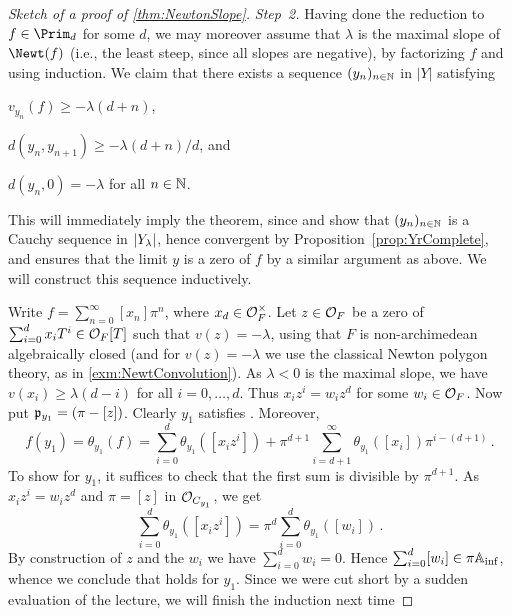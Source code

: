 \documentclass[a4paper, 10pt, oneside, DIV=9, chapterprefix=true, numbers=enddot,bibliography=totoc]{scrbook}
\begin{document}
\begin{proof}[Sketch of a proof of \cref{thm:NewtonSlope}]
	\emph{Step~2.} Having done the reduction to $f\in\Prim_d$ for some $d$, we may moreover assume that $\lambda$ is the maximal slope of $\Newt(f)$ (i.e., the least steep, since all slopes are negative), by factorizing $f$ and using induction. We claim that there exists a sequence $(y_n)_{n\in\mathbb{N}}$ in $|Y|$ satisfying
	\begin{alphanumerate}
		\item $v_{y_n}(f)\geq -\lambda(d+n)$,
		\item $d(y_n,y_{n+1})\geq -\lambda(d+n)/d$, and
		\item $d(y_n,0)=-\lambda$ for all $n\in\mathbb{N}$.
	\end{alphanumerate}
	This will immediately imply the theorem, since  and  show that $(y_n)_{n\in\mathbb{N}}$ is a Cauchy sequence in $|Y_{\-\lambda}|$, hence convergent by Proposition~\cref{prop:YrComplete}, and  ensures that the limit $y$ is a zero of $f$ by a similar argument as above. We will construct this sequence inductively.
	
	Write $f= \sum_{n=0}^\infty[x_n]\pi^n$, where $x_d\in\mathcal{O}_F^\times$. Let $z\in\mathcal{O}_F$ be a zero of $\sum_{i=0}^dx_iT^i\in\mathcal{O}_F[T]$ such that $v(z)=-\lambda$, using that $F$ is non-archimedean algebraically closed (and for $v(z)=-\lambda$ we use the classical Newton polygon theory, as in \cref{exm:NewtConvolution}). As $\lambda <0$ is the maximal slope, we have $v(x_i)\geq \lambda(d-i)$ for all $i=0,\dotsc,d$. Thus $x_iz^i=w_iz^d$ for some $w_i\in\mathcal{O}_F$. Now put $\mathfrak{p}_{y_1}=(\pi-[z])$. Clearly $y_1$ satisfies . Moreover,
	\begin{equation*}
		f(y_1)=\theta_{y_1}(f)=\sum_{i=0}^d\theta_{y_1}([x_iz^i])+\pi^{d+1}\sum_{i=d+1}^\infty\theta_{y_1}([x_i])\pi^{i-(d+1)}\,.
	\end{equation*}
	To show  for $y_1$, it suffices to check that the first sum is divisible by $\pi^{d+1}$. As $x_iz^i=w_iz^d$ and $\pi=[z]$ in $\mathcal{O}_{C_{y_1}}$, we get
	\begin{equation*}
		\sum_{i=0}^d\theta_{y_1}([x_iz^i])=\pi^d\sum_{i=0}^d\theta_{y_1}([w_i])\,.
	\end{equation*}
	By construction of $z$ and the $w_i$ we have $\sum_{i=0}^dw_i=0$. Hence $\sum_{i=0}^d[w_i]\in\pi\mathbb{A}_{\mathrm{inf}}$, whence we conclude that  holds for $y_1$. Since we were cut short by a sudden evaluation of the lecture, we will finish the induction next time \dotso
	

\end{proof}
\end{document}
